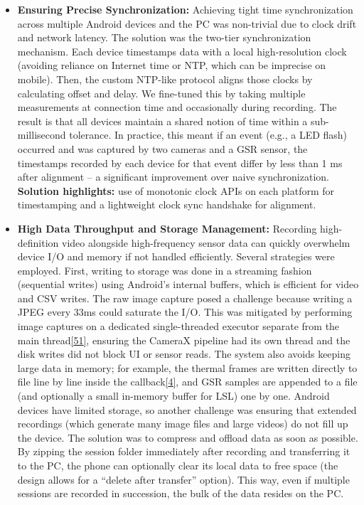 \documentclass[12pt,a4paper]{article}
\begin{document}
\begin{itemize}
\item
  \textbf{Ensuring Precise Synchronization:} Achieving tight time synchronization across multiple Android devices and the PC was non-trivial due to clock drift and network latency. The solution was the two-tier synchronization mechanism. Each device timestamps data with a local high-resolution clock (avoiding reliance on Internet time or NTP, which can be imprecise on mobile). Then, the custom NTP-like protocol aligns those clocks by calculating offset and delay. We fine-tuned this by taking multiple measurements at connection time and occasionally during recording. The result is that all devices maintain a shared notion of time within a sub-millisecond tolerance. In practice, this meant if an event (e.g., a LED flash) occurred and was captured by two cameras and a GSR sensor, the timestamps recorded by each device for that event differ by less than 1 ms after alignment -- a significant improvement over naive synchronization. \textbf{Solution highlights:} use of monotonic clock APIs on each platform for timestamping and a lightweight clock sync handshake for alignment.
\item
  \textbf{High Data Throughput and Storage Management:} Recording high-definition video alongside high-frequency sensor data can quickly overwhelm device I/O and memory if not handled efficiently. Several strategies were employed. First, writing to storage was done in a streaming fashion (sequential writes) using Android's internal buffers, which is efficient for video and CSV writes. The raw image capture posed a challenge because writing a JPEG every 33ms could saturate the I/O. This was mitigated by performing image captures on a dedicated single-threaded executor separate from the main thread\href{https://github.com/buccancs/GSR-Dual-Video-System/blob/05ae360cb7b4ae7c7861f72deb235ad64a74b38e/android/app/src/main/java/com/yourcompany/gsrcapture/hardware/RgbCameraManager.kt\#L70-L78}{{[}51{]}}, ensuring the CameraX pipeline had its own thread and the disk writes did not block UI or sensor reads. The system also avoids keeping large data in memory; for example, the thermal frames are written directly to file line by line inside the callback\href{https://github.com/buccancs/GSR-Dual-Video-System/blob/05ae360cb7b4ae7c7861f72deb235ad64a74b38e/android/app/src/main/java/com/yourcompany/gsrcapture/hardware/TopdonThermalCamera.kt\#L54-L62}{{[}4{]}}, and GSR samples are appended to a file (and optionally a small in-memory buffer for LSL) one by one. Android devices have limited storage, so another challenge was ensuring that extended recordings (which generate many image files and large videos) do not fill up the device. The solution was to compress and offload data as soon as possible. By zipping the session folder immediately after recording and transferring it to the PC, the phone can optionally clear its local data to free space (the design allows for a ``delete after transfer'' option). This way, even if multiple sessions are recorded in succession, the bulk of the data resides on the PC.

\end{itemize}
\end{document}
